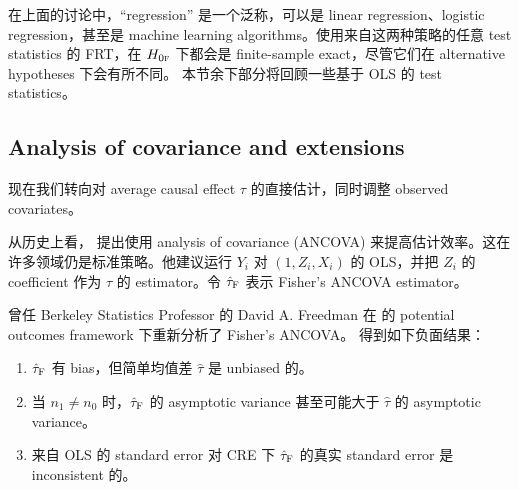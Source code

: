 在上面的讨论中，``regression'' 是一个泛称，可以是 linear regression、logistic regression，甚至是 machine learning algorithms。使用来自这两种策略的任意 test statistics 的 FRT，在 $H_{0\textsc{f}}$ 下都会是 finite-sample exact，尽管它们在 alternative hypotheses 下会有所不同。
本节余下部分将回顾一些基于 OLS 的 test statistics。

\subsection{Analysis of covariance and extensions}\label{sec::ancova}

现在我们转向对 average causal effect $\tau$ 的直接估计，同时调整 observed covariates。

从历史上看，\citet{fisher1925statistical} 提出使用 analysis of covariance (ANCOVA) 来提高估计效率。这在许多领域仍是标准策略。他建议运行 $Y_i$ 对 $(1, Z_i, X_i)$ 的 OLS，并把 $Z_i$ 的 coefficient 作为 $\tau$ 的 estimator。令 $\hat{\tau}_\textsc{F}$ 表示 Fisher's ANCOVA estimator。

曾任 Berkeley Statistics Professor 的 David A. Freedman 在 \citet{Neyman:1923} 的 potential outcomes framework 下重新分析了 Fisher's ANCOVA。\citet{freedman2008regression_a, freedman2008regression_b} 得到如下负面结果：
\begin{enumerate}
[(1)]
\item
$\hat{\tau}_\textsc{F}$ 有 bias，但简单均值差 $\hat{\tau}$ 是 unbiased 的。
\item 
当 $n_1\neq n_0$ 时，$\hat{\tau}_\textsc{F}$ 的 asymptotic variance 甚至可能大于 $\hat{\tau}$ 的 asymptotic variance。
\item 
来自 OLS 的 standard error 对 CRE 下 $\hat{\tau}_\textsc{F}$ 的真实 standard error 是 inconsistent 的。
\end{enumerate}


